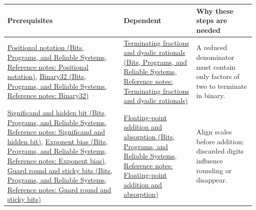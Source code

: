 {\def\LTcaptype{none} %
\begin{longtable}[]{@{}
  >{\raggedright\arraybackslash}p{}
  >{\raggedright\arraybackslash}p{}
  >{\raggedright\arraybackslash}p{}@{}}
\toprule\noalign{}
\begin{minipage}[b]{\linewidth}\raggedright
Prerequisites
\end{minipage} & \begin{minipage}[b]{\linewidth}\raggedright
Dependent
\end{minipage} & \begin{minipage}[b]{\linewidth}\raggedright
Why these steps are needed
\end{minipage} \\
\midrule\noalign{}
\endhead
\bottomrule\noalign{}
\endlastfoot
\href{../01-Bits-Programs-and-Reliable-Systems/main.pdf\#nameddest=appendix-83c3f28f7bda}{Positional notation (Bits, Programs, and Reliable Systems, Reference notes: Positional notation)}, \href{../01-Bits-Programs-and-Reliable-Systems/main.pdf\#nameddest=appendix-5057f9ad327f}{Binary32 (Bits, Programs, and Reliable Systems, Reference notes: Binary32)} & \href{../01-Bits-Programs-and-Reliable-Systems/main.pdf\#nameddest=appendix-2a2f1b74bdd3}{Terminating fractions and dyadic rationals (Bits, Programs, and Reliable Systems, Reference notes: Terminating fractions and dyadic rationals)} & A reduced denominator must contain only factors of two to terminate in binary. \\
\href{../01-Bits-Programs-and-Reliable-Systems/main.pdf\#nameddest=appendix-a24fd710cf67}{Significand and hidden bit (Bits, Programs, and Reliable Systems, Reference notes: Significand and hidden bit)}, \href{../01-Bits-Programs-and-Reliable-Systems/main.pdf\#nameddest=appendix-2fae058c82e1}{Exponent bias (Bits, Programs, and Reliable Systems, Reference notes: Exponent bias)}, \href{../01-Bits-Programs-and-Reliable-Systems/main.pdf\#nameddest=appendix-b572b631069b}{Guard round and sticky bits (Bits, Programs, and Reliable Systems, Reference notes: Guard round and sticky bits)} & \href{../01-Bits-Programs-and-Reliable-Systems/main.pdf\#nameddest=appendix-a1b1b4580dfd}{Floating-point addition and absorption (Bits, Programs, and Reliable Systems, Reference notes: Floating-point addition and absorption)} & Align scales before addition; discarded digits influence rounding or disappear. \\

\end{longtable}}
